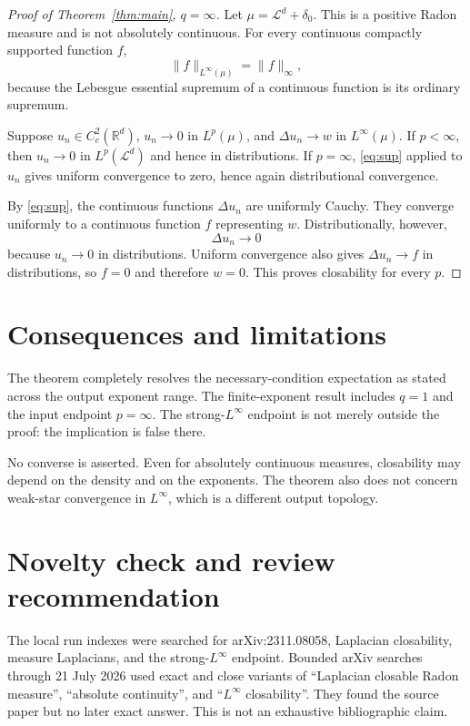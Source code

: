 \documentclass[11pt]{article}
\newcommand{\R}{\mathbb R}
\newcommand{\Leb}{\mathcal L}
\begin{document}
\begin{proof}[Proof of Theorem~\ref{thm:main}, $q=\infty$]
Let $\mu=\Leb^d+\delta_0$.  This is a positive Radon measure and is not
absolutely continuous.  For every continuous compactly supported function
$f$,
\begin{equation}\label{eq:sup}
 \|f\|_{L^\infty(\mu)}=\|f\|_\infty,
\end{equation}
because the Lebesgue essential supremum of a continuous function is its
ordinary supremum.

Suppose $u_n\in C_c^2(\R^d)$, $u_n\to0$ in $L^p(\mu)$, and
$\Delta u_n\to w$ in $L^\infty(\mu)$.  If $p<\infty$, then
$u_n\to0$ in $L^p(\Leb^d)$ and hence in distributions.  If $p=\infty$,
\eqref{eq:sup} applied to $u_n$ gives uniform convergence to zero, hence again
distributional convergence.

By \eqref{eq:sup}, the continuous functions $\Delta u_n$ are uniformly
Cauchy.  They converge uniformly to a continuous function $f$ representing
$w$.  Distributionally, however,
\[
 \Delta u_n\longrightarrow0
\]
because $u_n\to0$ in distributions.  Uniform convergence also gives
$\Delta u_n\to f$ in distributions, so $f=0$ and therefore $w=0$.
This proves closability for every $p$.
\end{proof}

\section{Consequences and limitations}

The theorem completely resolves the necessary-condition expectation as
stated across the output exponent range.  The finite-exponent result includes
$q=1$ and the input endpoint $p=\infty$.  The strong-$L^\infty$ endpoint is
not merely outside the proof: the implication is false there.

No converse is asserted.  Even for absolutely continuous measures,
closability may depend on the density and on the exponents.  The theorem also
does not concern weak-star convergence in $L^\infty$, which is a different
output topology.

\section{Novelty check and review recommendation}

The local run indexes were searched for arXiv:2311.08058, Laplacian
closability, measure Laplacians, and the strong-$L^\infty$ endpoint.  Bounded
arXiv searches through 21 July 2026 used exact and close variants of
``Laplacian closable Radon measure'', ``absolute continuity'', and
``$L^\infty$ closability''.  They found the source paper but no later exact
answer.  This is not an exhaustive bibliographic claim.
\end{document}
